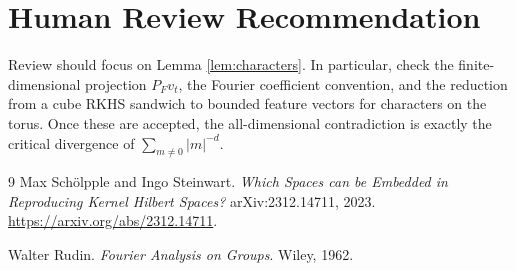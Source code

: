 \documentclass[11pt]{article}
\begin{document}
\section*{Human Review Recommendation}

Review should focus on Lemma \ref{lem:characters}. In particular, check the
finite-dimensional projection \(P_Fv_t\), the Fourier coefficient convention,
and the reduction from a cube RKHS sandwich to bounded feature vectors for
characters on the torus. Once these are accepted, the all-dimensional
contradiction is exactly the critical divergence of
\(\sum_{m\ne0}|m|^{-d}\).

\begin{thebibliography}{9}
Max Sch\"olpple and Ingo Steinwart.
\newblock \emph{Which Spaces can be Embedded in Reproducing Kernel Hilbert Spaces?}
\newblock arXiv:2312.14711, 2023.
\newblock \url{https://arxiv.org/abs/2312.14711}.

Walter Rudin.
\newblock \emph{Fourier Analysis on Groups}.
\newblock Wiley, 1962.
\end{thebibliography}
\end{document}
